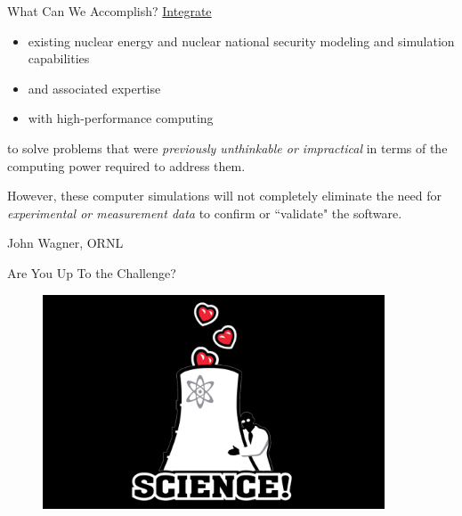 \documentclass[xcolor=x11names,compress]{beamer}
\renewcommand{\(}{\begin{columns}}
\renewcommand{\)}{\end{columns}}
\newcommand{\<}[1]{\begin{column}{#1}}
\renewcommand{\>}{\end{column}}
\begin{document}
\begin{frame}{What Can We Accomplish?}
\underline{Integrate}
\begin{itemize}
\item existing nuclear energy and nuclear national security modeling and simulation capabilities
\item and associated expertise
\item with high-performance computing
\end{itemize}    
to solve problems that were \emph{previously unthinkable or impractical} in terms of the computing power required to address them.

\vspace*{1em}
However, these computer simulations will not completely eliminate the need for \emph{experimental or measurement data} to confirm or ``validate" the software. 

\vspace*{1em}
\hspace*{0.25 in} John Wagner, ORNL
\end{frame}

%
%

\begin{frame}{Are You Up To the Challenge?}
\begin{figure}
\includegraphics[height=2.5in,clip]{science}
\end{figure}
\end{frame}
\end{document}
